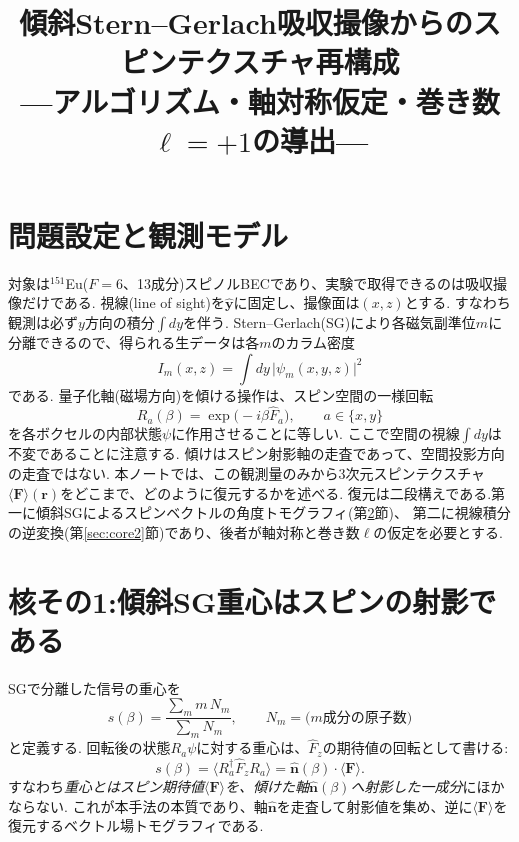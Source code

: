 \documentclass[11pt]{ltjsarticle}
\title{傾斜Stern--Gerlach吸収撮像からのスピンテクスチャ再構成\\
\normalsize---アルゴリズム・軸対称仮定・巻き数$\ell=+1$の導出---}
\author{}
\date{}
\newcommand{\Fv}{\bm{F}}
\newcommand{\rv}{\bm{r}}
\newcommand{\expv}[1]{\langle #1 \rangle}
\begin{document}
\maketitle

\section{問題設定と観測モデル}

対象は${}^{151}$Eu($F=6$、13成分)スピノルBECであり、実験で取得できるのは吸収撮像だけである.
視線(line of sight)を$\hat{\bm y}$に固定し、撮像面は$(x,z)$とする.
すなわち観測は必ず$y$方向の積分$\int dy$を伴う.
Stern--Gerlach(SG)により各磁気副準位$m$に分離できるので、得られる生データは各$m$のカラム密度
\begin{equation}
  I_m(x,z)=\int dy\,\bigl|\psi_m(x,y,z)\bigr|^2
\end{equation}
である.
量子化軸(磁場方向)を傾ける操作は、スピン空間の一様回転
\begin{equation}
  R_a(\beta)=\exp\!\bigl(-i\beta \hat F_a\bigr),\qquad a\in\{x,y\}
  \label{eq:R}
\end{equation}
を各ボクセルの内部状態$\psi$に作用させることに等しい.
ここで空間の視線$\int dy$は不変であることに注意する.
傾けはスピン射影軸の走査であって、空間投影方向の走査ではない.
本ノートでは、この観測量のみから3次元スピンテクスチャ$\expv{\Fv}(\rv)$をどこまで、どのように復元するかを述べる.
復元は二段構えである.第一に傾斜SGによるスピンベクトルの角度トモグラフィ(第\ref{sec:core1}節)、
第二に視線積分の逆変換(第\ref{sec:core2}節)であり、後者が軸対称と巻き数$\ell$の仮定を必要とする.

\section{核その1:傾斜SG重心はスピンの射影である}
\label{sec:core1}

SGで分離した信号の重心を
\begin{equation}
  s(\beta)=\frac{\sum_m m\,N_m}{\sum_m N_m},\qquad N_m=\text{($m$成分の原子数)}
\end{equation}
と定義する.
回転後の状態$R_a\psi$に対する重心は、$\hat F_z$の期待値の回転として書ける:
\begin{equation}
  s(\beta)=\expv{R_a^\dagger \hat F_z R_a}
  =\hat{\bm n}(\beta)\cdot\expv{\Fv}.
  \label{eq:centroid-projection}
\end{equation}
すなわち\emph{重心とはスピン期待値$\expv{\Fv}$を、傾けた軸$\hat{\bm n}(\beta)$へ射影した一成分}にほかならない.
これが本手法の本質であり、軸$\hat{\bm n}$を走査して射影値を集め、逆に$\expv{\Fv}$を復元するベクトル場トモグラフィである.
\end{document}
